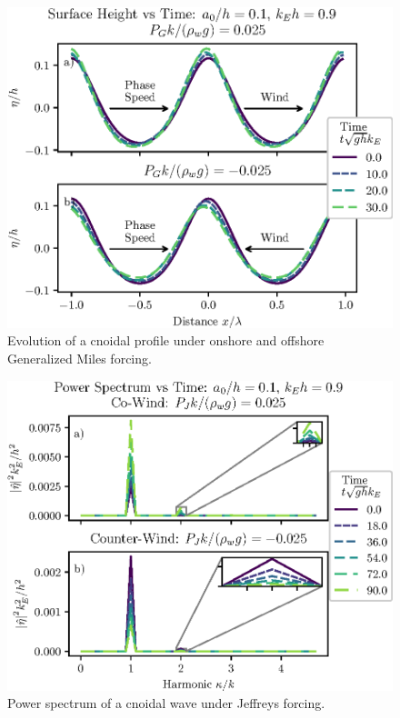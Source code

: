 \documentclass{jfm}
\begin{document}
\begin{figure}
  \centering
  \includegraphics{Snapshots-Positive-Negative-Cnoidal-GM.eps}
  \caption{
    Evolution of a cnoidal profile under onshore and offshore Generalized
    Miles forcing.
  }
\end{figure}

\begin{figure}
  \centering
  \includegraphics{Power-Spectrum-Jeffreys.eps}
  \caption{
    Power spectrum of a cnoidal wave under Jeffreys forcing.
  }
\end{figure}
\end{document}
